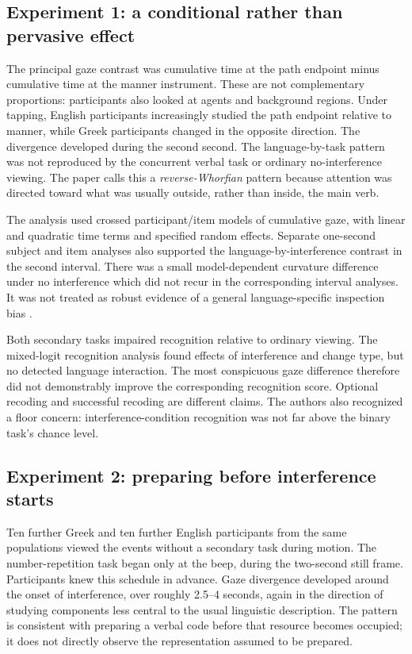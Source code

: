 \subsection{Experiment 1: a conditional rather than pervasive effect}

The principal gaze contrast was cumulative time at the path endpoint
minus cumulative time at the manner instrument. These are not complementary
proportions: participants also looked at agents and background regions.
Under tapping, English participants increasingly studied the path endpoint
relative to manner, while Greek participants changed in the opposite
direction. The divergence developed during the second second.
The language-by-task pattern was not reproduced by the concurrent verbal
task or ordinary no-interference viewing. The paper calls this a
\emph{reverse-Whorfian} pattern because attention was directed toward
what was usually outside, rather than inside, the main verb.

The analysis used crossed participant/item models of cumulative gaze,
with linear and quadratic time terms and specified random effects.
Separate one-second subject and item analyses also supported the
language-by-interference contrast in the second interval.
There was a small model-dependent curvature difference under no interference
which did not recur in the corresponding interval analyses. It was not
treated as robust evidence of a general language-specific inspection bias
\cite[pp.~71--75,Tables~1--2,Figs.~3--5]{TrueswellPapafragou2010DualTaskLC}.

Both secondary tasks impaired recognition relative to ordinary viewing.
The mixed-logit recognition analysis found effects of interference and
change type, but no detected language interaction. The most conspicuous
gaze difference therefore did not demonstrably improve the corresponding
recognition score. Optional recoding and successful recoding are different
claims. The authors also recognized a floor concern: interference-condition
recognition was not far above the binary task's chance level.

\subsection{Experiment 2: preparing before interference starts}

Ten further Greek and ten further English participants from the same
populations viewed the events without a secondary task during motion.
The number-repetition task began only at the beep, during the two-second
still frame. Participants knew this schedule in advance.
Gaze divergence developed around the onset of interference, over roughly
2.5--4 seconds, again in the direction of studying components less
central to the usual linguistic description. The pattern is consistent
with preparing a verbal code before that resource becomes occupied;
it does not directly observe the representation assumed to be prepared.

